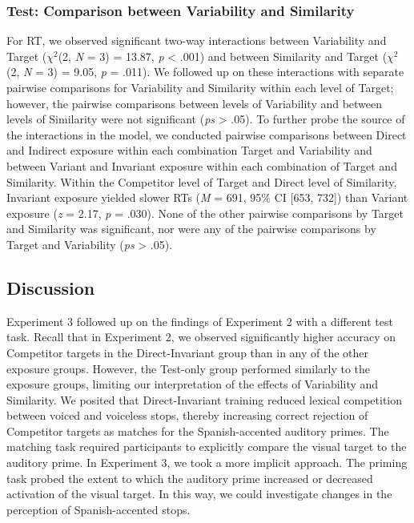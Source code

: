 \documentclass[preprint, 3p, authoryear]{elsarticle} %
\begin{document}
\hypertarget{test-comparison-between-variability-and-similarity}{%
\subsubsection{Test: Comparison between Variability and Similarity}\label{test-comparison-between-variability-and-similarity}}

For RT, we observed significant two-way interactions between Variability and Target (\(\chi^2\)(2, \emph{N} = 3) = 13.87, \emph{p} \textless{} .001) and between Similarity and Target (\(\chi^2\)(2, \emph{N} = 3) = 9.05, \emph{p} = .011).
We followed up on these interactions with separate pairwise comparisons for Variability and Similarity within each level of Target; however, the pairwise comparisons between levels of Variability and between levels of Similarity were not significant (\emph{ps} \textgreater{} .05).
To further probe the source of the interactions in the model, we conducted pairwise comparisons between Direct and Indirect exposure within each combination Target and Variability and between Variant and Invariant exposure within each combination of Target and Similarity.
Within the Competitor level of Target and Direct level of Similarity, Invariant exposure yielded slower RTs (\emph{M} = 691, 95\% CI {[}653, 732{]}) than Variant exposure (\emph{z} = 2.17, \emph{p} = .030).
None of the other pairwise comparisons by Target and Similarity was significant, nor were any of the pairwise comparisons by Target and Variability (\emph{ps} \textgreater{} .05).

\hypertarget{discussion-1}{%
\subsection{Discussion}\label{discussion-1}}

Experiment 3 followed up on the findings of Experiment 2 with a different test task.
Recall that in Experiment 2, we observed significantly higher accuracy on Competitor targets in the Direct-Invariant group than in any of the other exposure groups.
However, the Test-only group performed similarly to the exposure groups, limiting our interpretation of the effects of Variability and Similarity.
We posited that Direct-Invariant training reduced lexical competition between voiced and voiceless stops, thereby increasing correct rejection of Competitor targets as matches for the Spanish-accented auditory primes.
The matching task required participants to explicitly compare the visual target to the auditory prime.
In Experiment 3, we took a more implicit approach.
The priming task probed the extent to which the auditory prime increased or decreased activation of the visual target.
In this way, we could investigate changes in the perception of Spanish-accented stops.
\end{document}
